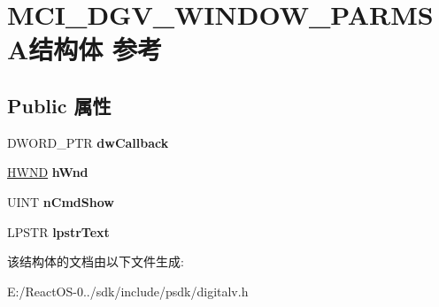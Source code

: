 \hypertarget{struct_m_c_i___d_g_v___w_i_n_d_o_w___p_a_r_m_s_a}{}\section{M\+C\+I\+\_\+\+D\+G\+V\+\_\+\+W\+I\+N\+D\+O\+W\+\_\+\+P\+A\+R\+M\+S\+A结构体 参考}
\label{struct_m_c_i___d_g_v___w_i_n_d_o_w___p_a_r_m_s_a}
\subsection*{Public 属性}
\begin{DoxyCompactItemize}
\item 
\mbox{\label{struct_m_c_i___d_g_v___w_i_n_d_o_w___p_a_r_m_s_a_a0f961c9a4824fa5bbb801155aeeb912f}} 
D\+W\+O\+R\+D\+\_\+\+P\+TR {\bfseries dw\+Callback}
\item 
\mbox{\label{struct_m_c_i___d_g_v___w_i_n_d_o_w___p_a_r_m_s_a_a19455bfb34e073611770bfa49c3d20b0}} 
\hyperlink{interfacevoid}{H\+W\+ND} {\bfseries h\+Wnd}
\item 
\mbox{\label{struct_m_c_i___d_g_v___w_i_n_d_o_w___p_a_r_m_s_a_a0dcc0d22059a47464f96e0d02a235d04}} 
U\+I\+NT {\bfseries n\+Cmd\+Show}
\item 
\mbox{\label{struct_m_c_i___d_g_v___w_i_n_d_o_w___p_a_r_m_s_a_aab5e508c0508e239340ad10cb15315ed}} 
L\+P\+S\+TR {\bfseries lpstr\+Text}
\end{DoxyCompactItemize}


该结构体的文档由以下文件生成\+:\begin{DoxyCompactItemize}
\item 
E\+:/\+React\+O\+S-\/0../sdk/include/psdk/digitalv.\+h\end{DoxyCompactItemize}
